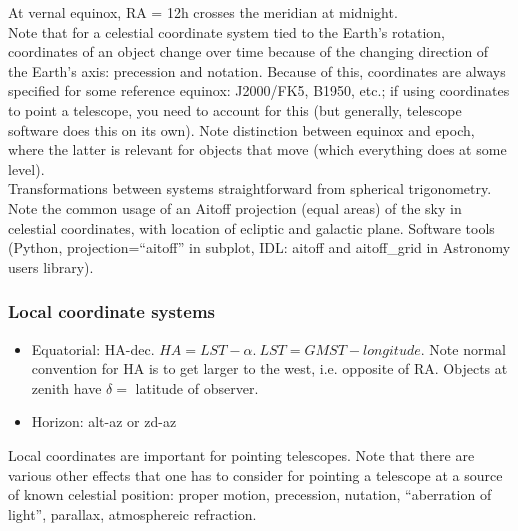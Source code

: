 \documentclass[12pt]{article}
\begin{document}
\noindent At vernal equinox, RA = 12h crosses the meridian at midnight.\\

\noindent Note that for a celestial coordinate system tied to the
Earth's rotation,
coordinates of an object change over time because of the changing direction
of the Earth's axis: precession and notation. Because of this, coordinates are
always specified for some reference equinox: J2000/FK5, B1950, etc.; if using
coordinates to point a telescope, you need to account for this (but generally,
telescope software does this on its own). Note distinction between equinox and
epoch, where the latter is relevant for objects that move (which everything does
at some level).\\

\noindent Transformations between systems straightforward from spherical
trigonometry.\\

\noindent Note the common usage of an Aitoff projection (equal areas)
of the sky in celestial
coordinates, with location of ecliptic and galactic plane.
Software tools (Python, projection=``aitoff'' in subplot,
IDL: aitoff and aitoff\_grid in Astronomy users library).

\subsubsection*{Local coordinate systems}
\begin{itemize}
    \item Equatorial: HA-dec. $HA=LST - \alpha.\ LST=GMST - longitude$.
        Note normal convention for HA is to get larger to the west, i.e.
        opposite of RA. Objects at zenith have $\delta=$ latitude of observer.
    \item Horizon: alt-az or zd-az
\end{itemize}
Local coordinates are important for pointing telescopes. Note that there are
various other effects that one has to consider for pointing a telescope at a
source of known celestial position: proper motion, precession, nutation,
``aberration of light'', parallax, atmosphereic refraction.
\end{document}
